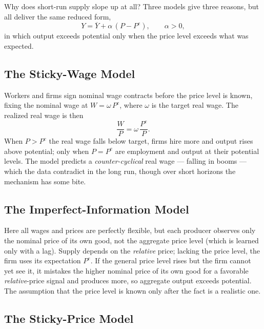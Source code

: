 Why does short-run supply slope up at all? Three models give three reasons, but all deliver the same reduced form,
\[
Y = \overline{Y} + \alpha\,(P - P^{e}), \qquad \alpha>0,
\]
in which output exceeds potential only when the price level exceeds what was expected.

\subsection{The Sticky-Wage Model}

Workers and firms sign nominal wage contracts before the price level is known, fixing the nominal wage at $W=\omega\, P^{e}$, where $\omega$ is the target real wage. The realized real wage is then
\[
\frac{W}{P} = \omega\,\frac{P^{e}}{P}.
\]
When $P>P^{e}$ the real wage falls below target, firms hire more and output rises above potential; only when $P=P^{e}$ are employment and output at their potential levels. The model predicts a \emph{counter-cyclical} real wage --- falling in booms --- which the data contradict in the long run, though over short horizons the mechanism has some bite.

\subsection{The Imperfect-Information Model}

Here all wages and prices are perfectly flexible, but each producer observes only the nominal price of its own good, not the aggregate price level (which is learned only with a lag). Supply depends on the \emph{relative} price; lacking the price level, the firm uses its expectation $P^{e}$. If the general price level rises but the firm cannot yet see it, it mistakes the higher nominal price of its own good for a favorable \emph{relative}-price signal and produces more, so aggregate output exceeds potential. The assumption that the price level is known only after the fact is a realistic one.

\subsection{The Sticky-Price Model}

